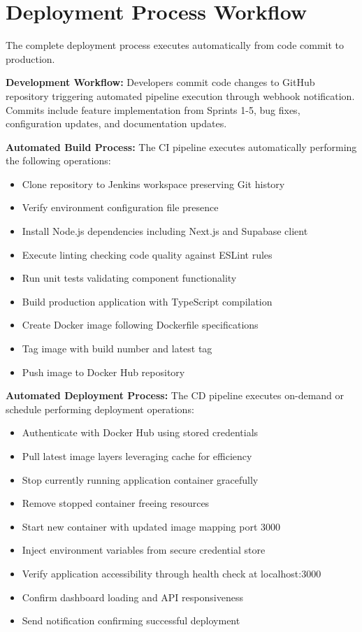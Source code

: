 \section{Deployment Process Workflow}

The complete deployment process executes automatically from code commit to production.

\textbf{Development Workflow:} Developers commit code changes to GitHub repository triggering automated pipeline execution through webhook notification. Commits include feature implementation from Sprints 1-5, bug fixes, configuration updates, and documentation updates.

\textbf{Automated Build Process:} The CI pipeline executes automatically performing the following operations:
\begin{itemize}
\item Clone repository to Jenkins workspace preserving Git history
\item Verify environment configuration file presence
\item Install Node.js dependencies including Next.js and Supabase client
\item Execute linting checking code quality against ESLint rules
\item Run unit tests validating component functionality
\item Build production application with TypeScript compilation
\item Create Docker image following Dockerfile specifications
\item Tag image with build number and latest tag
\item Push image to Docker Hub repository
\end{itemize}

\textbf{Automated Deployment Process:} The CD pipeline executes on-demand or schedule performing deployment operations:
\begin{itemize}
\item Authenticate with Docker Hub using stored credentials
\item Pull latest image layers leveraging cache for efficiency
\item Stop currently running application container gracefully
\item Remove stopped container freeing resources
\item Start new container with updated image mapping port 3000
\item Inject environment variables from secure credential store
\item Verify application accessibility through health check at localhost:3000
\item Confirm dashboard loading and API responsiveness
\item Send notification confirming successful deployment
\end{itemize}

